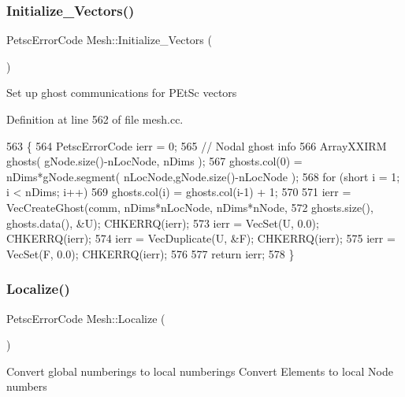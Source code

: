 \mbox{\label{class_mesh_af9e180bd8adb9c495e6c38840ea19f10}} 
\subsubsection{\texorpdfstring{Initialize\+\_\+\+Vectors()}{Initialize\_Vectors()}}
{\footnotesize\ttfamily Petsc\+Error\+Code Mesh\+::\+Initialize\+\_\+\+Vectors (\begin{DoxyParamCaption}{ }\end{DoxyParamCaption})\hspace{0.3cm}{\ttfamily [protected]}}

Set up ghost communications for P\+Et\+Sc vectors 

Definition at line 562 of file mesh.\+cc.


\begin{DoxyCode}
563 \{
564     PetscErrorCode ierr = 0;
565     \textcolor{comment}{// Nodal ghost info}
566     ArrayXXIRM ghosts( gNode.size()-nLocNode, nDims );
567     ghosts.col(0) = nDims*gNode.segment( nLocNode,gNode.size()-nLocNode );
568     \textcolor{keywordflow}{for} (\textcolor{keywordtype}{short} i = 1; i < nDims; i++)
569       ghosts.col(i) = ghosts.col(i-1) + 1;
570 
571     ierr = VecCreateGhost(comm, nDims*nLocNode, nDims*nNode,
572                           ghosts.size(), ghosts.data(), &U); CHKERRQ(ierr);
573     ierr = VecSet(U, 0.0); CHKERRQ(ierr);
574     ierr = VecDuplicate(U, &F); CHKERRQ(ierr);
575     ierr = VecSet(F, 0.0); CHKERRQ(ierr);
576 
577     \textcolor{keywordflow}{return} ierr;
578 \}
\end{DoxyCode}
\mbox{\label{class_mesh_a54a12376bf99f4f4991af01fc23c9c09}} 
\subsubsection{\texorpdfstring{Localize()}{Localize()}}
{\footnotesize\ttfamily Petsc\+Error\+Code Mesh\+::\+Localize (\begin{DoxyParamCaption}{ }\end{DoxyParamCaption})\hspace{0.3cm}{\ttfamily [protected]}}

Convert global numberings to local numberings Convert Elements to local Node numbers 

